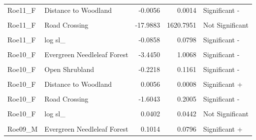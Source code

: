 \documentclass[10pt,a4paper]{article}
\begin{document}
\begin{longtable}[t]{llrrl}
Roe11\_F & Distance to Woodland & -0.0056 & 0.0014 & Significant -\\
\cellcolor{gray!10}{Roe11\_F} & \cellcolor{gray!10}{Distance to Hedges} & \cellcolor{gray!10}{-0.0024} & \cellcolor{gray!10}{0.0006} & \cellcolor{gray!10}{Significant -}\\
Roe11\_F & Road Crossing & -17.9883 & 1620.7951 & Not Significant\\
\addlinespace
\cellcolor{gray!10}{Roe11\_F} & \cellcolor{gray!10}{sl\_} & \cellcolor{gray!10}{0.0027} & \cellcolor{gray!10}{0.0007} & \cellcolor{gray!10}{Significant +}\\
Roe11\_F & log sl\_ & -0.0858 & 0.0798 & Significant -\\
\cellcolor{gray!10}{Roe11\_F} & \cellcolor{gray!10}{cos ta\_} & \cellcolor{gray!10}{0.1259} & \cellcolor{gray!10}{0.0663} & \cellcolor{gray!10}{Significant +}\\
Roe10\_F & Evergreen Needleleaf Forest & -3.4450 & 1.0068 & Significant -\\
\cellcolor{gray!10}{Roe10\_F} & \cellcolor{gray!10}{Tall Grassland} & \cellcolor{gray!10}{-1.0916} & \cellcolor{gray!10}{0.1125} & \cellcolor{gray!10}{Significant -}\\
\addlinespace
Roe10\_F & Open Shrubland & -0.2218 & 0.1161 & Significant -\\
\cellcolor{gray!10}{Roe10\_F} & \cellcolor{gray!10}{Other} & \cellcolor{gray!10}{-2.9179} & \cellcolor{gray!10}{0.5000} & \cellcolor{gray!10}{Significant -}\\
Roe10\_F & Distance to Woodland & 0.0056 & 0.0008 & Significant +\\
\cellcolor{gray!10}{Roe10\_F} & \cellcolor{gray!10}{Distance to Hedges} & \cellcolor{gray!10}{-0.0037} & \cellcolor{gray!10}{0.0003} & \cellcolor{gray!10}{Significant -}\\
Roe10\_F & Road Crossing & -1.6043 & 0.2005 & Significant -\\
\addlinespace
\cellcolor{gray!10}{Roe10\_F} & \cellcolor{gray!10}{sl\_} & \cellcolor{gray!10}{0.0012} & \cellcolor{gray!10}{0.0004} & \cellcolor{gray!10}{Significant +}\\
Roe10\_F & log sl\_ & 0.0402 & 0.0442 & Not Significant\\
\cellcolor{gray!10}{Roe10\_F} & \cellcolor{gray!10}{cos ta\_} & \cellcolor{gray!10}{-0.7981} & \cellcolor{gray!10}{0.0366} & \cellcolor{gray!10}{Significant -}\\
Roe09\_M & Evergreen Needleleaf Forest & 0.1014 & 0.0796 & Significant +\\

\end{longtable}
\end{document}
